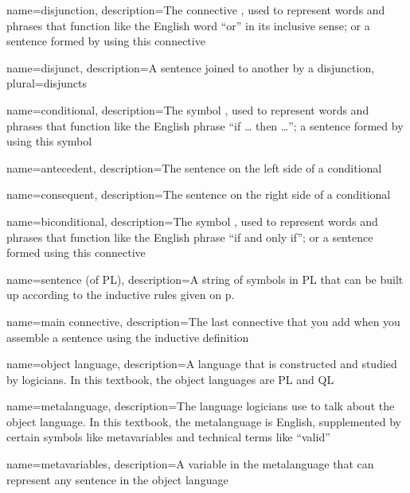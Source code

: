 {
name=disjunction,
description={The connective \eor, used to represent words and phrases that function like the English word ``or'' in its inclusive sense; or a sentence formed by using this connective}
}

{
name=disjunct,
description={A sentence joined to another by a \gls{disjunction}},
plural=disjuncts
}

{
name=conditional,
description={The symbol \eif, used to represent words and phrases that function like the English phrase ``if \dots{} then \dots''; a sentence formed by using this symbol}
}

{
name=antecedent,
description={The sentence on the left side of a \gls{conditional}}
}


{
name=consequent,
description={The sentence on the right side of a \gls{conditional}}
}

{
name=biconditional,
description={The symbol \eiff, used to represent words and phrases that function like the English phrase ``if and only if''; or a sentence formed using this connective}
}

{
name=sentence (of PL),
description={A string of symbols in PL that can be built up according to the inductive rules given on p.~\pageref{PLsentences}}
}

{
name=main connective,
description={The last connective that you add when you assemble a sentence using the inductive definition}
}

{
name=object language,
description={A language that is constructed and studied by logicians. In this textbook,
 the object languages are PL and QL}
}

{
name=metalanguage,
description={The language logicians use to talk about the object language. In this textbook, the metalanguage is English, supplemented by certain symbols like metavariables and technical terms like ``valid''}
}

{
name=metavariables,
description={A variable in the metalanguage that can represent any sentence in the object language}
}
